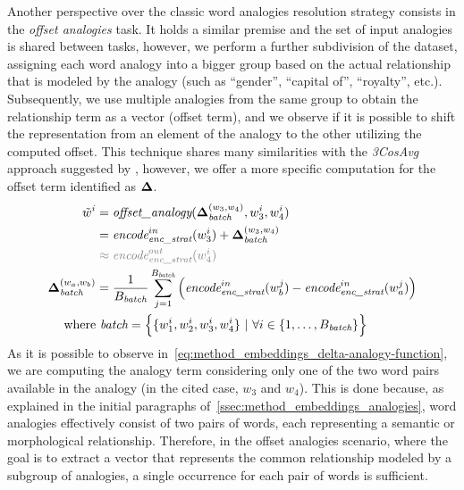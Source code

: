 Another perspective over the classic word analogies resolution strategy consists in the \emph{offset analogies} task.
It holds a similar premise and the set of input analogies is shared between tasks, however, we perform a further subdivision of the dataset, assigning each word analogy into a bigger group based on the actual relationship that is modeled by the analogy (such as ``gender'', ``capital of'', ``royalty'', etc.).
Subsequently, we use multiple analogies from the same group to obtain the relationship term as a vector (offset term), and we observe if it is possible to shift the representation from an element of the analogy to the other utilizing the computed offset.
This technique shares many similarities with the \emph{3CosAvg} approach suggested by \citet{drozd2016}, however, we offer a more specific computation for the offset term identified as $\bm{\mathbf{\Delta}}$.
\begin{equation}
    \label{eq:method_embeddings_delta-analogy-function}
    \begin{aligned}
        \tilde{w}^i &= \textit{offset\_analogy}(\gbm{\Delta}_{\textit{batch}}^{(w_3, w_4)}, w_3^i, w_4^i) \\
        &= {\textit{encode}}_{\textit{enc\_strat}}^{in}(w_3^i) + \gbm{\Delta}_{\textit{batch}}^{(w_3, w_4)} \\
        &\color{gray} \approx {\textit{encode}}_{\textit{enc\_strat}}^{out}(w_4^i) \\
        \gbm{\Delta}_{\textit{batch}}^{(w_a, w_b)} &= \frac{1}{B_{\textit{batch}}}\sum_{j=1}^{B_{\textit{batch}}}{\Bigl({\textit{encode}}_{\textit{enc\_strat}}^{in}(w_b^j) - {\textit{encode}}_{\textit{enc\_strat}}^{in}(w_a^j)\Bigr)} \\
        \text{where}&\ \textit{batch} = \Bigl\{ \{w_1^i, w_2^i, w_3^i, w_4^i\} \ |\ \forall i \in \{1,\ldots, B_{\textit{batch}}\} \Bigr\}
    \end{aligned}
\end{equation}
As it is possible to observe in~\cref{eq:method_embeddings_delta-analogy-function}, we are computing the analogy term considering only one of the two word pairs available in the analogy (in the cited case, $w_3$ and $w_4$).
This is done because, as explained in the initial paragraphs of~\cref{ssec:method_embeddings_analogies}, word analogies effectively consist of two pairs of words, each representing a semantic or morphological relationship.
Therefore, in the offset analogies scenario, where the goal is to extract a vector that represents the common relationship modeled by a subgroup of analogies, a single occurrence for each pair of words is sufficient.

